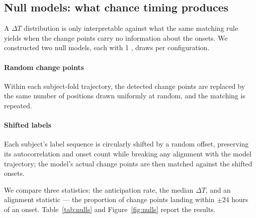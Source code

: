 \documentclass[preprint,12pt,authoryear]{elsarticle}
\newcommand{\dt}{$\Delta T$}
\providecommand{\DIFaddtex}[1]{{\protect\color{blue} \sf #1}} %
\providecommand{\DIFaddend}{} %
\providecommand{\DIFadd}[1]{\texorpdfstring{\DIFaddtex{#1}}{#1}} %
\DeclareRobustCommand{\DIFaddend}{\DIFOaddend \let\includegraphics\DIFOincludegraphics} %
\begin{document}
\subsection{Null models: what chance timing produces}
\label{sec:nulls}

\DIFadd{A \dt{} distribution is only interpretable against what the same
matching rule yields when the change points carry no information about
the onsets. We constructed two null models, each with 1}{\DIFadd{,}}\DIFadd{000 draws per
configuration.
}

\paragraph{Random change points} \DIFadd{Within each subject-fold trajectory,
the detected change points are replaced by the same number of positions
drawn uniformly at random, and the matching is repeated.
}

\paragraph{Shifted labels} \DIFadd{Each subject's label sequence is circularly
shifted by a random offset, preserving its autocorrelation and onset
count while breaking any alignment with the model trajectory; the
model's actual change points are then matched against the shifted
onsets.
}

\DIFadd{We compare three statistics: the anticipation rate, the median \dt{},
and an alignment statistic --- the proportion of change points landing
within $\pm 24$ hours of an onset. Table~\ref{tab:nulls} and
Figure~\ref{fig:nulls} report the results}\DIFaddend .
\end{document}
